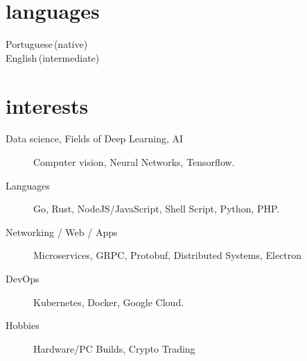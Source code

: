 \documentclass[]{cv-mauri}
\begin{document}
\section*{languages}
\begin{tabularcv}
    Portuguese\,(native) \\
    English\,(intermediate)
\end{tabularcv}

\section*{interests}
\begin{description}
	\item [Data science, Fields of Deep Learning, AI] Computer vision, Neural Networks, Tensorflow.
	\item [Languages] Go, Rust, NodeJS/JavaScript, Shell Script, Python, PHP.
	\item [Networking / Web / Apps] Microservices, GRPC, Protobuf, Distributed Systems, Electron
	\item [DevOps] Kubernetes, Docker, Google Cloud.
	\item [Hobbies] Hardware/PC Builds, Crypto Trading
\end{description}
\end{document}
